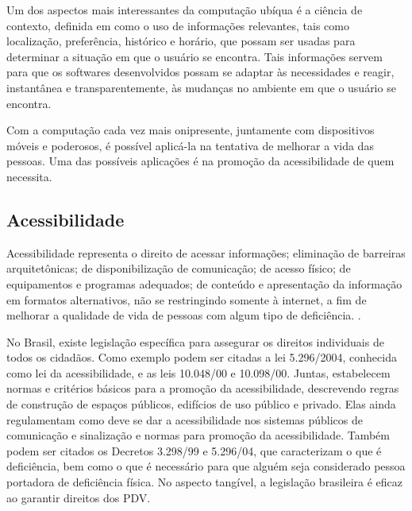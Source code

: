 \documentclass[twoside,english,brazilian]{UNISINOSartigo}
\begin{document}
Um dos aspectos mais interessantes da computação ubíqua é a ciência de contexto, definida em  como o uso de informações relevantes, tais como localização, preferência, histórico e horário, que possam ser usadas para determinar a situação em que o usuário se encontra. Tais informações servem para que os softwares desenvolvidos possam se adaptar às necessidades e reagir, instantânea e transparentemente, às mudanças no ambiente em que o usuário se encontra.

Com a computação cada vez mais onipresente, juntamente com dispositivos móveis e poderosos, é possível aplicá-la na tentativa de melhorar a vida das pessoas. Uma das possíveis aplicações é na promoção da acessibilidade de quem necessita. 

\subsection{Acessibilidade}
Acessibilidade representa o direito de acessar informações; eliminação de barreiras arquitetônicas; de disponibilização de comunicação; de acesso físico; de equipamentos e programas adequados; de conteúdo e apresentação da informação em formatos alternativos, não se restringindo somente à internet, a fim de melhorar a qualidade de vida de pessoas com algum tipo de deficiência. \cite{AcessibilidadeBrasil}. 

No Brasil, existe legislação específica para assegurar os direitos individuais de todos os cidadãos. Como exemplo podem ser citadas a lei 5.296/2004, conhecida como lei da acessibilidade, e as leis 10.048/00 e 10.098/00. Juntas, estabelecem normas e critérios básicos para a promoção da acessibilidade, descrevendo regras de construção de espaços públicos, edifícios de uso público e privado. Elas ainda regulamentam como deve se dar a acessibilidade nos sistemas públicos de comunicação e sinalização e normas para promoção da acessibilidade. Também podem ser citados os Decretos 3.298/99 e 5.296/04, que caracterizam o que é deficiência, bem como o que é necessário para que alguém seja considerado pessoa portadora de deficiência física. No aspecto tangível, a legislação brasileira é eficaz ao garantir direitos dos PDV.
\end{document}
